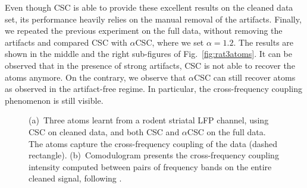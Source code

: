 Even though CSC is able to provide these excellent results on the cleaned data set, its performance heavily relies on the manual removal of the artifacts. Finally, we repeated the previous experiment on the full data, without removing the artifacts and compared CSC with $\alpha$CSC, where we set $\alpha=1.2$. The results are shown in the middle and the right sub-figures of Fig.~\ref{fig:rat3atoms}. It can be observed that in the presence of strong artifacts, CSC is not able to recover the atoms anymore. On the contrary, we observe that $\alpha$CSC can still recover atoms as observed in the artifact-free regime. In particular, the cross-frequency coupling phenomenon is still visible.


\begin{figure}[htb]
    \centering
    \caption[Three atoms learnt from a rodent striatal LFP channel, using CSC on cleaned data, and both CSC and $\alpha$CSC on the full data.]{(a)~Three atoms learnt from a rodent striatal LFP channel, using CSC on cleaned data, and both CSC and $\alpha$CSC on the full data. The atoms capture the cross-frequency coupling of the data (dashed rectangle). (b)~Comodulogram presents the cross-frequency coupling intensity computed between pairs of frequency bands on the entire cleaned signal, following \cite{tort2010measuring}.}
    \label{fig:ratdata}
\end{figure}




